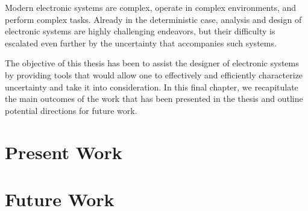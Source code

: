 Modern electronic systems are complex, operate in complex environments, and
perform complex tasks. Already in the deterministic case, analysis and design of
electronic systems are highly challenging endeavors, but their difficulty is
escalated even further by the uncertainty that accompanies such systems.

The objective of this thesis has been to assist the designer of electronic
systems by providing tools that would allow one to effectively and efficiently
characterize uncertainty and take it into consideration. In this final chapter,
we recapitulate the main outcomes of the work that has been presented in the
thesis and outline potential directions for future work.

\section{Present Work}

\section{Future Work}
